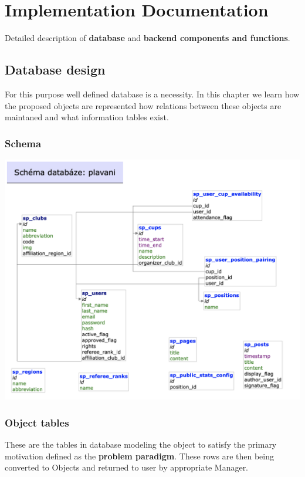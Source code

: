 \chapter{Implementation Documentation}
Detailed description of \textbf{database} and \textbf{backend components and functions}.  

\section{Database design}
For this purpose well defined database is a necessity. In this chapter we learn how the proposed objects are represented how relations between these objects are maintaned and what information tables exist.
\subsection{Schema}
\includegraphics[scale=0.45]{img/schema.png}
\subsection{Object tables}
These are the tables in database modeling the object to satisfy the primary motivation defined as the \textbf{problem paradigm}. These rows are then being converted to Objects and returned to user by appropriate Manager.
